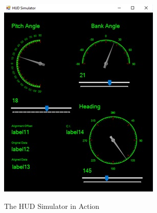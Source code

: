 \begin{figure}
	\centering
 		\caption{The HUD Simulator in Action}
      	\includegraphics[width=\textwidth,height=\textheight,keepaspectratio]{img/hudsimaction}
    \label{fig:hudsimaction}
\end{figure}




